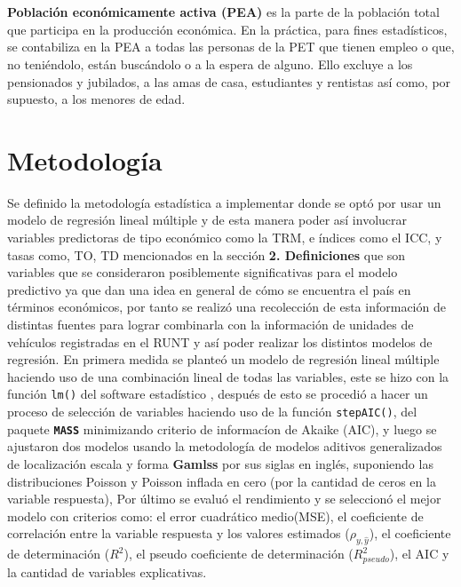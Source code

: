 \documentclass[11pt,twoside]{article}
\begin{document}
\\
\\
\textbf{Población económicamente activa (PEA)} es la parte de la población total que participa en la producción económica. En la práctica, para fines estadísticos, se contabiliza en la PEA a todas las personas de la PET que tienen empleo o que, no teniéndolo, están buscándolo o a la espera de alguno. Ello excluye a los pensionados y jubilados, a las amas de casa, estudiantes y rentistas así como, por supuesto, a los menores de edad.

\section{Metodología}
\noindent
Se definido la metodología estadística a implementar donde se optó por usar un modelo de regresión lineal múltiple y de esta manera poder así involucrar variables predictoras de tipo económico como la TRM, e índices como el ICC, y tasas como, TO, TD mencionados en la sección \textbf{2. Definiciones} que son variables que se consideraron posiblemente significativas para el modelo predictivo ya que dan una idea en general de cómo se encuentra el país en términos económicos, por tanto se realizó una recolección de esta información de distintas fuentes para lograr combinarla con la información de unidades de vehículos registradas en el RUNT y así poder realizar los distintos modelos de regresión. En primera medida se planteó un modelo de regresión lineal múltiple haciendo uso de una combinación lineal de todas las variables, este se hizo con la función \texttt{lm()} del software estadístico ,  después de esto se procedió a hacer un proceso de selección de variables haciendo uso de la función \texttt{stepAIC()}, del paquete \textbf{\texttt{MASS}} minimizando criterio de informacíon de Akaike (AIC), y luego se ajustaron dos modelos usando la metodología de modelos aditivos generalizados de localización escala y forma \textbf{Gamlss} por sus siglas en inglés, suponiendo las distribuciones Poisson y Poisson inflada en cero (por la cantidad de ceros en la variable respuesta), Por último se evaluó el rendimiento y se seleccionó el mejor modelo con criterios como: el error cuadrático medio(MSE),  el coeficiente de correlación entre la variable respuesta y los valores estimados ($\rho_{y,\hat{y}}$), el coeficiente de determinación ($R^{2}$), el pseudo coeficiente de determinación ($R_{pseudo}^{2}$), el AIC y la cantidad de variables explicativas. 
\end{document}

